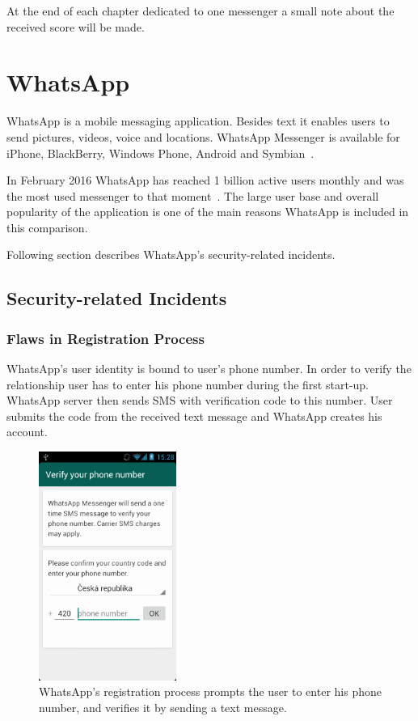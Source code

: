 \documentclass[thesis=M,english]{FITthesis}[2012/10/20]
\begin{document}
At the end of each chapter dedicated to one messenger a small note about the received score will be made.

\section{WhatsApp}\label{whatsapp}

WhatsApp is a mobile messaging application. Besides text it enables users to send pictures, videos, voice and locations. WhatsApp Messenger is available for iPhone, BlackBerry, Windows Phone, Android and Symbian~\cite{whatsapphomepage}.

In February 2016 WhatsApp has reached 1 billion active users monthly and was the most used messenger to that moment~\cite{whatsappusers}. The large user base and overall popularity of the application is one of the main reasons WhatsApp is included in this comparison.

Following section describes WhatsApp's security-related incidents.

\subsection{Security-related Incidents}

\subsubsection{Flaws in Registration Process}\label{whatsapp-registration}

WhatsApp's user identity is bound to user's phone number. In order to verify the relationship user has to enter his phone number during the first start-up. WhatsApp server then sends SMS with verification code to this number. User submits the code from the received text message and WhatsApp creates his account.  

\begin{figure}[htb]
	\centering
	\includegraphics[width=0.4\textwidth]{whatsapp-registration.png}
	\caption[WhatsApp's registration process]{WhatsApp's registration process prompts the user to enter his phone number, and verifies it by sending a text message.}
	\label{img:whatsapp_reg}
\end{figure}
\end{document}
